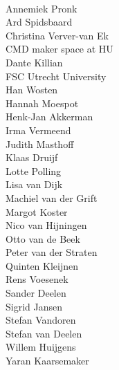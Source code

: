 \documentclass{report}
\begin{document}
\clearpage
\begin{figure}
    \centering
\end{figure}
\clearpage

 \\

Annemiek Pronk\\
Ard Spidsbaard\\ Christina Verver-van Ek\\
CMD maker space at HU\\
Dante Killian\\
FSC Utrecht University\\
Han Wosten\\
Hannah Moespot\\
Henk-Jan Akkerman\\
Irma Vermeend\\
Judith Masthoff\\
Klaas Druijf\\
Lotte Polling\\ 
Lisa van Dijk\\
Machiel van der Grift\\
Margot Koster\\
Nico van Hijningen\\
Otto van de Beek\\
Peter van der Straten\\
Quinten Kleijnen\\
Rens Voesenek\\
Sander Deelen\\
Sigrid Jansen\\
Stefan Vandoren\\
Stefan van Deelen\\
Willem Huijgens\\
Yaran Kaarsemaker 

\end{document}
